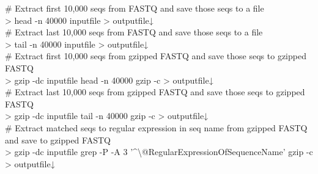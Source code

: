 \documentclass[titlepage,10pt,a4paper,english]{jsbook}
\newenvironment{cmd}{\begin{oframed}\raggedright\ttfamily\footnotesize\setlength{\baselineskip}{1.4em}}{\end{oframed}\vspace{-1em}}
\begin{document}
\begin{cmd}
\# Extract first 10,000 seqs from FASTQ and save those seqs to a file\\
{\textgreater} head -n 40000 inputfile {\textgreater} outputfile↓\\
\# Extract last 10,000 seqs from FASTQ and save those seqs to a file\\
{\textgreater} tail -n 40000 inputfile {\textgreater} outputfile↓\\
\# Extract first 10,000 seqs from gzipped FASTQ and save those seqs to gzipped FASTQ\\
{\textgreater} gzip -dc inputfile {\textbar} head -n 40000 {\textbar} gzip -c {\textgreater} outputfile↓\\
\# Extract last 10,000 seqs from gzipped FASTQ and save those seqs to gzipped FASTQ\\
{\textgreater} gzip -dc inputfile {\textbar} tail -n 40000 {\textbar} gzip -c {\textgreater} outputfile↓\\
\# Extract matched seqs to regular expression in seq name from gzipped FASTQ and save to gzipped FASTQ\\
{\textgreater} gzip -dc inputfile {\textbar} grep -P -A 3 '{\textasciicircum}{\textbackslash}@RegularExpressionOfSequenceName' {\textbar} gzip -c {\textgreater} outputfile↓
\end{cmd}
\end{document}

